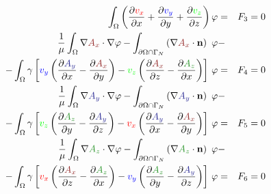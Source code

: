 \documentclass[smallextended]{svjour3}       %
\begin{document}
\begin{eqnarray}
			\int_{\Omega} \left(\frac{\partial \textcolor{red}{v_x}}{\partial x} + \frac{\partial \textcolor{blue}{v_y}}{\partial y} + \frac{\partial \textcolor{green}{v_z}}{\partial z}\right) \varphi & = & F_3 = 0 \\
			\frac{1}{\mu}\int_{\Omega}\nabla \textcolor{darkRed}{A_x} \cdot \nabla \varphi - \int_{\partial \Omega \cap \Gamma_{N}} \left(\nabla \textcolor{darkRed}{A_x}\cdot \mathbf{n}\right)\ \varphi 
			 \nonumber& - \\
			-  \int_{\Omega} \gamma \left[\textcolor{blue}{v_y} \left(\frac{\partial \textcolor{darkBlue}{A_y}}{\partial x} - \frac{\partial \textcolor{darkRed}{A_x}}{\partial y}\right) - \textcolor{green}{v_z} \left(\frac{\partial \textcolor{darkRed}{A_x}}{\partial z} - \frac{\partial \textcolor{darkGreen}{A_z}}{\partial x}\right)\right]\,\varphi & = & F_4 = 0 \\			
			\frac{1}{\mu}\int_{\Omega}\nabla \textcolor{darkBlue}{A_y} \cdot \nabla \varphi - \int_{\partial \Omega \cap \Gamma_{N}} \left(\nabla \textcolor{darkBlue}{A_y}\cdot \mathbf{n}\right)\ \varphi 
			 \nonumber& - \\
			- \int_{\Omega} \gamma \left[\textcolor{green}{v_z} \left(\frac{\partial \textcolor{darkGreen}{A_z}}{\partial y} - \frac{\partial \textcolor{darkBlue}{A_y}}{\partial z}\right) - \textcolor{red}{v_x} \left(\frac{\partial \textcolor{darkBlue}{A_y}}{\partial x} - \frac{\partial \textcolor{darkRed}{A_x}}{\partial y}\right)\right]\,\varphi & = & F_5 = 0 \\			
			\frac{1}{\mu}\int_{\Omega}\nabla \textcolor{darkGreen}{A_z} \cdot \nabla \varphi - \int_{\partial \Omega \cap \Gamma_{N}} \left(\nabla \textcolor{darkGreen}{A_z}\cdot \mathbf{n}\right)\ \varphi 
			 \nonumber& - \\
			-  \int_{\Omega} \gamma \left[\textcolor{red}{v_x} \left(\frac{\partial \textcolor{darkRed}{A_x}}{\partial z} - \frac{\partial \textcolor{darkGreen}{A_z}}{\partial x}\right) - \textcolor{blue}{v_y} \left(\frac{\partial \textcolor{darkGreen}{A_z}}{\partial y} - \frac{\partial \textcolor{darkBlue}{A_y}}{\partial z}\right)\right]\,\varphi & = & F_6 = 0 \\
			 \nonumber 
		\end{eqnarray}
		
\end{document}
